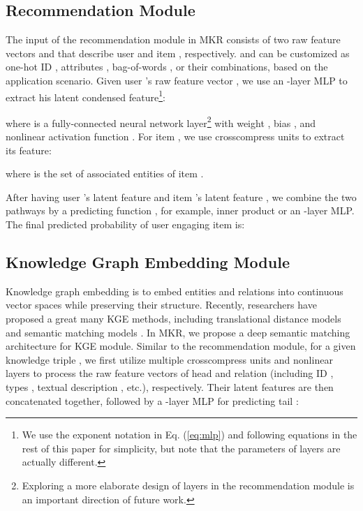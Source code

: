 \documentclass[sigconf]{acmart}
\begin{document}
		
	\subsection{Recommendation Module}
	\label{section:rm}
		The input of the recommendation module in MKR consists of two raw feature vectors  and  that describe user  and item , respectively.
		 and  can be customized as one-hot ID \cite{he2017neural}, attributes \cite{wang2018shine}, bag-of-words \cite{wang2015collaborative}, or their combinations, based on the application scenario.
		Given user 's raw feature vector , we use an -layer MLP to extract his latent condensed feature\footnote{We use the exponent notation  in Eq. (\ref{eq:mlp}) and following equations in the rest of this paper for simplicity, but note that the parameters of  layers are actually different.}:
						
		where  is a fully-connected neural network layer\footnote{Exploring a more elaborate design of layers in the recommendation module is an important direction of future work.} with weight , bias , and nonlinear activation function .
		For item , we use  crosscompress units to extract its feature:
		
		where  is the set of associated entities of item .
		
		After having user 's latent feature  and item 's latent feature , we combine the two pathways by a predicting function , for example, inner product or an -layer MLP.
		The final predicted probability of user  engaging item  is:
				
	
	
	\subsection{Knowledge Graph Embedding Module}
	\label{section:kgem}
		Knowledge graph embedding is to embed entities and relations into continuous vector spaces while preserving their structure.
		Recently, researchers have proposed a great many KGE methods, including translational distance models \cite{bordes2013translating,lin2015learning} and semantic matching models \cite{nickel2016holographic,liu2017analogical}.
		In MKR, we propose a deep semantic matching architecture for KGE module.
		Similar to the recommendation module, for a given knowledge triple , we first utilize multiple crosscompress units and nonlinear layers to process the raw feature vectors of head  and relation  (including ID \cite{lin2015learning}, types \cite{xie2016representation}, textual description \cite{wang2014knowledge}, etc.), respectively.
		Their latent features are then concatenated together, followed by a -layer MLP for predicting tail :
		
\end{document}
